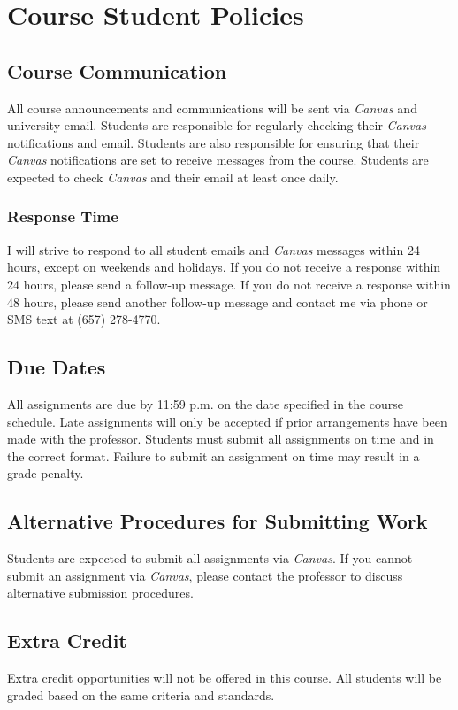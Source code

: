 \documentclass[11pt, letterpaper]{article}
\begin{document}
\section{Course Student Policies}

\subsection*{Course Communication}
All course announcements and communications will be sent via \emph{Canvas} and university email. Students are responsible for regularly checking their \emph{Canvas} notifications and email. Students are also responsible for ensuring that their \emph{Canvas} notifications are set to receive messages from the course. Students are expected to check \emph{Canvas} and their email at least once daily.

\subsubsection*{Response Time}I will strive to respond to all student emails and \emph{Canvas} messages within 24 hours, except on weekends and holidays. If you do not receive a response within 24 hours, please send a follow-up message. If you do not receive a response within 48 hours, please send another follow-up message and contact me via phone or SMS text at (657) 278-4770.

\subsection*{Due Dates}
All assignments are due by 11:59 p.m. on the date specified in the course schedule. Late assignments will only be accepted if prior arrangements have been made with the professor. Students must submit all assignments on time and in the correct format. Failure to submit an assignment on time may result in a grade penalty.

\subsection*{Alternative Procedures for Submitting Work}
Students are expected to submit all assignments via \emph{Canvas}. If you cannot submit an assignment via \emph{Canvas}, please contact the professor to discuss alternative submission procedures.

\subsection*{Extra Credit}
Extra credit opportunities will not be offered in this course. All students will be graded based on the same criteria and standards.
\end{document}
